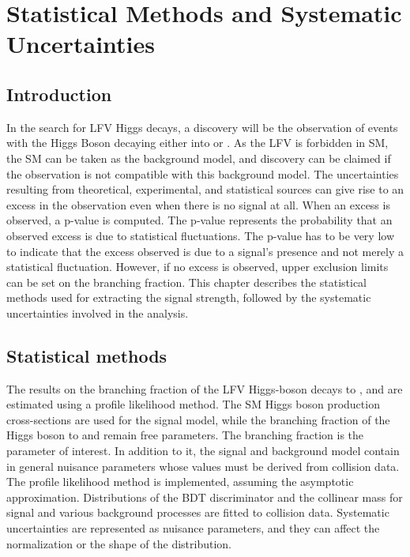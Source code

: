 %
%

\chapter{Statistical Methods and Systematic Uncertainties}
\label{sig_ext}

\section{Introduction}
In the search for LFV Higgs decays, a discovery will be the observation of events with the Higgs Boson decaying either into \mutau or \etau. As the LFV is forbidden in SM, the SM can be taken as the background model, and discovery can be claimed if the observation is not compatible with this background model. The uncertainties resulting from theoretical, experimental, and statistical sources can give rise to an excess in the observation even when there is no signal at all. When an excess is observed, a p-value is computed. The p-value represents the probability that an observed excess is due to statistical fluctuations. The p-value has to be very low to indicate that the excess observed is due to a signal's presence and not merely a statistical fluctuation. However, if no excess is observed, upper exclusion limits can be set on the branching fraction. This chapter describes the statistical methods used for extracting the signal strength, followed by the systematic uncertainties involved in the analysis.

\section{Statistical methods}
\label{stat_meth}

The results on the branching fraction of the LFV Higgs-boson decays to \mutau, and \etau are estimated using a profile likelihood method. The SM Higgs boson production cross-sections are used for the signal model, while the branching fraction of the Higgs boson to \mutau and \etau remain free parameters. The branching fraction is the parameter of interest. In addition to it, the signal and background model contain in general nuisance parameters whose values must be derived from collision data. The profile likelihood method is implemented, assuming the asymptotic approximation. Distributions of the BDT discriminator and the collinear mass for signal and various background processes are fitted to collision data. Systematic uncertainties are represented as nuisance parameters, and they can affect the normalization or the shape of the distribution.

